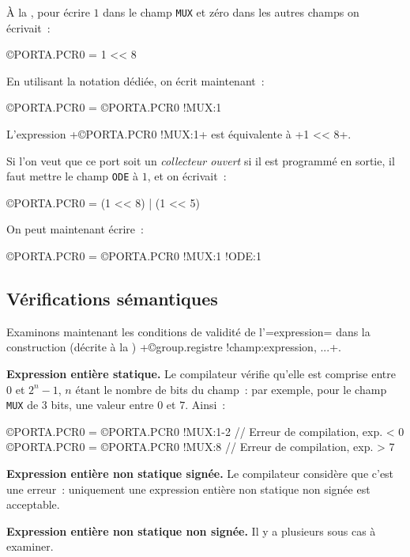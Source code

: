 À la , pour écrire $1$ dans le champ \texttt{MUX} et zéro dans les autres champs on écrivait~:

\begin{PLM}
©PORTA.PCR0 = 1 << 8
\end{PLM}

En utilisant la notation dédiée, on écrit maintenant~: 

\begin{PLM}
©PORTA.PCR0 = {©PORTA.PCR0 !MUX:1}
\end{PLM}

L'expression \plm+{©PORTA.PCR0 !MUX:1}+ est équivalente à \plm+1 << 8+.

Si l'on veut que ce port soit un \emph{collecteur ouvert} si il est programmé en sortie, il faut mettre le champ \texttt{ODE} à $1$, et on écrivait~:
\begin{PLM}
©PORTA.PCR0 = (1 << 8) | (1 << 5)
\end{PLM}

On peut maintenant écrire~:

\begin{PLM}
©PORTA.PCR0 = {©PORTA.PCR0 !MUX:1 !ODE:1}
\end{PLM}


\subsection{Vérifications sémantiques}
 
Examinons maintenant les conditions de validité de l'\plm=expression= dans la construction (décrite à la ) \plm+{©group.registre !champ:expression, ...}+.

{\bf Expression entière statique.} Le compilateur vérifie qu'elle est comprise entre $0$ et $2^n-1$, $n$ étant le nombre de bits du champ~: par exemple, pour le champ \texttt{MUX} de $3$ bits, une valeur entre $0$ et $7$. Ainsi~:

\begin{PLM}
©PORTA.PCR0 = {©PORTA.PCR0 !MUX:1-2} // Erreur de compilation, exp. < 0
©PORTA.PCR0 = {©PORTA.PCR0 !MUX:8} // Erreur de compilation, exp. > 7
\end{PLM}

{\bf Expression entière non statique signée.} Le compilateur considère que c'est une erreur~: uniquement une expression entière non statique non signée est acceptable.


{\bf Expression entière non statique non signée.} Il y a plusieurs sous cas à examiner.

